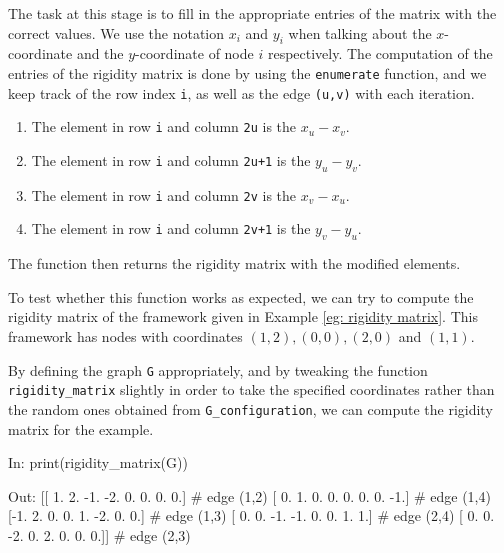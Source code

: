 \begin{flushleft}
The task at this stage is to fill in the appropriate entries of the matrix with the correct values. We use the notation $x_i$ and $y_i$ when talking about the $x$-coordinate and the $y$-coordinate of node $i$ respectively. The computation of the entries of the rigidity matrix is done by using the \texttt{enumerate} function, and we keep track of the row index \texttt{i}, as well as the edge \texttt{(u,v)} with each iteration.
\begin{enumerate}
    \item The element in row \texttt{i} and column \texttt{2u} is the $x_u - x_v$.
    \vspace{-3mm}
    \item The element in row \texttt{i} and column \texttt{2u+1} is the $y_u - y_v$.
    \vspace{-3mm}
    \item The element in row \texttt{i} and column \texttt{2v} is the $x_v - x_u$.
    \vspace{-3mm}
    \item The element in row \texttt{i} and column \texttt{2v+1} is the $y_v - y_u$.
\end{enumerate}

The function then returns the rigidity matrix with the modified elements. 
\end{flushleft}

\begin{flushleft}
To test whether this function works as expected, we can try to compute the rigidity matrix of the framework given in Example \ref{eg: rigidity matrix}. This framework has nodes with coordinates $(1,2), (0,0), (2,0)$ and $(1,1)$. 
\end{flushleft}

\begin{flushleft}
By defining the graph \texttt{G} appropriately, and by tweaking the function \texttt{rigidity\_matrix} slightly in order to take the specified coordinates rather than the random ones obtained from \texttt{G\_configuration}, we can compute the rigidity matrix for the example.
\end{flushleft}

\begin{code}
    In: print(rigidity_matrix(G))

    Out: [[ 1.  2. -1. -2.  0.  0.  0.  0.]    # edge (1,2)
          [ 0.  1.  0.  0.  0.  0.  0. -1.]    # edge (1,4)
          [-1.  2.  0.  0.  1. -2.  0.  0.]    # edge (1,3)
          [ 0.  0. -1. -1.  0.  0.  1.  1.]    # edge (2,4)
          [ 0.  0. -2.  0.  2.  0.  0.  0.]]   # edge (2,3)
\end{code}    

